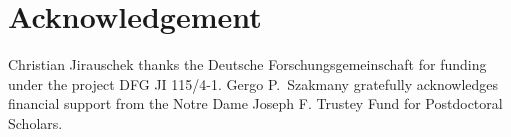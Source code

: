 \documentclass[journal]{IEEEtran}
\begin{document}
%
%
\section*{Acknowledgement}
%
%
Christian Jirauschek thanks the Deutsche Forschungsgemeinschaft for funding under the project DFG JI 115/4-1.
Gergo P.~Szakmany gratefully acknowledges financial support from the Notre Dame Joseph F. Trustey Fund for Postdoctoral Scholars.

%


\end{document}
